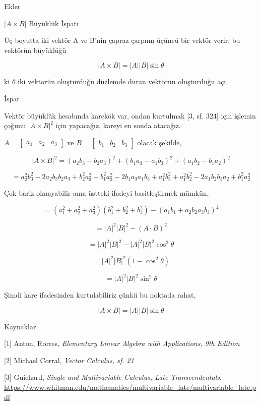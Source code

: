 \documentclass[12pt,fleqn]{article}\usepackage{../../common}
\begin{document}
Ekler

$|A \times B|$ Büyüklük İspatı

Üç boyutta iki vektör A ve B'nin çapraz çarpımı üçüncü bir vektör verir,
bu vektörün büyüklüğü

$$
|A \times B| = |A||B|\sin\theta
$$

ki $\theta$ iki vektörün oluşturduğu düzlemde duran vektörün oluşturduğu açı.

İspat

Vektör büyüklük hesabında karekök var, ondan kurtulmak [3, sf. 324] için işlemin
çoğunu $|A \times B|^2$ için yapacağız, kareyi en sonda atacağız.

$A=[\begin{array}{ccc} a_1&a_2&a_3 \end{array}]$ ve
$B=[\begin{array}{ccc} b_1&b_2&b_3 \end{array}]$ olacak şekilde,

$$
|A \times B|^2 = (a_2 b_3 - b_2 a_3)^2 + (b_1 a_3 - a_1 b_3)^2 + (a_1 b_2 - b_1 a_2)^2
$$

$$
= a_2^2 b_3^2 - 2a_2b_3b_2a_3 + b_2^2 a_3^2 + b_1^2 a_3^2 - 2b_1 a_3 a_1 b_3 +
a_1^2 b_3^2 + a_1^2 b_2^2 - 2a_1 b_2 b_1 a_2 + b_1^2 a_2^2
$$

Çok bariz olmayabilir ama üstteki ifadeyi basitleştirmek mümkün,

$$
= (a_1^2 + a_2^2 + a_3^2) (b_1^2 + b_2^2 + b_3^2 ) - (a_1 b_1 + a_2 b_2 a_3 b_3)^2
$$

$$
= |A|^2 |B|^2 - (A \cdot B)^2
$$

$$
= |A|^2 |B|^2 - |A|^2 |B|^2 \cos^2\theta
$$

$$
= |A|^2 |B|^2 (1-\cos^2\theta)
$$

$$
= |A|^2 |B|^2 \sin^2\theta
$$

Şimdi kare ifadesinden kurtulabiliriz çünkü bu noktada rahat,

$$
|A \times B| = |A||B|\sin\theta
$$


Kaynaklar

[1] Anton, Rorres, {\em Elementary Linear Algebra with Applications, 9th 
Edition}

[2] Michael Corral, {\em Vector Calculus, sf. 21}

[3] Guichard, {\em Single and Multivariable Calculus, Late Transcendentals},
    \url{https://www.whitman.edu/mathematics/multivariable_late/multivariable_late.pdf}
\end{document}
